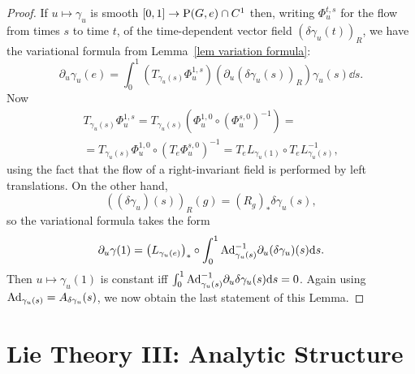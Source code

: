 \begin{proof}
    If $u\mapsto \gamma_u$ is smooth $[0,1]\to \mathrm{P}(G,e)\cap C^1$ then, writing $\Phi^{t,s}_u$ for the flow from times $s$ to time $t$, of the time-dependent vector field $(\delta\gamma_u(t))_R$, we have the variational formula from Lemma~\ref{lem variation formula}:
    \[\partial_u\gamma_u(e)=\int_0^1 \left(T_{\gamma_u(s)}\Phi^{1,s}_u\right)\left(\partial_u \left(\delta\gamma_u(s)\right)_R\right)\gamma_u(s)\dd s.\]
    Now 
    \begin{multline}
        T_{\gamma_u(s)}\Phi^{1,s}_u=T_{\gamma_u(s)}\left(\Phi_u^{1,0}\circ (\Phi^{s,0}_u)^{-1}\right)=\\=T_{\gamma_u(s)}\Phi_u^{1,0}\circ \left(T_e\Phi^{s,0}_u\right)^{-1}= T_{e}L_{\gamma_u(1)}\circ T_e L_{\gamma_u(s)}^{-1},
    \end{multline}
    using the fact that the flow of a right-invariant field is performed by left translations.  On the other hand,
    \[((\delta \gamma_u)(s))_R(g)=\left(R_g\right)_\ast \delta\gamma_u(s),\]
    so the variational formula takes the form
    \[\partial_u\gamma(1)=\left(L_{\gamma_u(e)}\right)_\ast\circ\int_0^1 \mathrm{Ad}_{\gamma_u(s)}^{-1}\partial_u(\delta\gamma_u)(s){\mathrm{d}} s.\]
    Then $u\mapsto\gamma_u(1)$ is constant iff $\int_0^1\mathrm{Ad}_{\gamma_u(s)}^{-1}\partial_u\delta\gamma_u(s){\mathrm{d}} s=0$. Again using $\mathrm{Ad}_{\gamma_u(s)}=A_{\delta \gamma_u}(s)$, we now obtain the last statement of this Lemma.
\end{proof}















\clearpage
\section{Lie Theory III: Analytic Structure}\label{sec: Lie theory iii}


